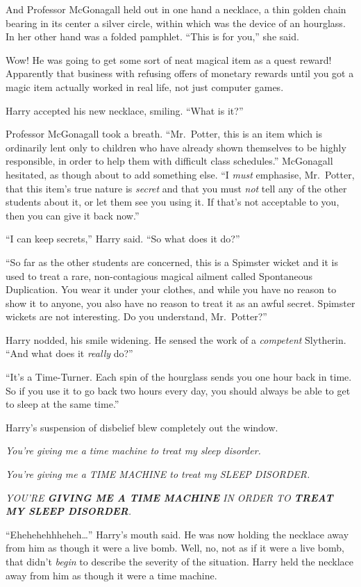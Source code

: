 And Professor McGonagall held out in one hand a necklace, a thin golden
chain bearing in its center a silver circle, within which was the device
of an hourglass. In her other hand was a folded pamphlet. ``This is for
you,'' she said.

Wow! He was going to get some sort of neat magical item as a quest
reward! Apparently that business with refusing offers of monetary
rewards until you got a magic item actually worked in real life, not
just computer games.

Harry accepted his new necklace, smiling. ``What is it?''

Professor McGonagall took a breath. ``Mr.~Potter, this is an item which
is ordinarily lent only to children who have already shown themselves to
be highly responsible, in order to help them with difficult class
schedules.'' McGonagall hesitated, as though about to add something
else. ``I \emph{must} emphasise, Mr.~Potter, that this item's true
nature is \emph{secret} and that you must \emph{not} tell any of the
other students about it, or let them see you using it. If that's not
acceptable to you, then you can give it back now.''

``I can keep secrets,'' Harry said. ``So what does it do?''

``So far as the other students are concerned, this is a Spimster wicket
and it is used to treat a rare, non-contagious magical ailment called
Spontaneous Duplication. You wear it under your clothes, and while you
have no reason to show it to anyone, you also have no reason to treat it
as an awful secret. Spimster wickets are not interesting. Do you
understand, Mr.~Potter?''

Harry nodded, his smile widening. He sensed the work of a
\emph{competent} Slytherin. ``And what does it \emph{really} do?''

``It's a Time-Turner. Each spin of the hourglass sends you one hour back
in time. So if you use it to go back two hours every day, you should
always be able to get to sleep at the same time.''

Harry's suspension of disbelief blew completely out the window.

\emph{You're giving me a time machine to treat my sleep disorder.}

\emph{You're giving me a TIME MACHINE to treat my SLEEP DISORDER.}

\emph{YOU'RE \textbf{GIVING ME A TIME MACHINE} IN ORDER TO \textbf{TREAT
MY SLEEP DISORDER}.}

``Ehehehehhheheh\ldots{}'' Harry's mouth said. He was now holding the
necklace away from him as though it were a live bomb. Well, no, not as
if it were a live bomb, that didn't \emph{begin} to describe the
severity of the situation. Harry held the necklace away from him as
though it were a time machine.

